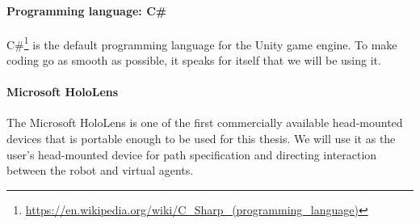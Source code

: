 \paragraph{Programming language: C\#} 
C\#\footnote{\protect\url{https://en.wikipedia.org/wiki/C\_Sharp\_(programming\_language)}} is the default programming language for the Unity game engine. To make coding go as smooth as possible, it speaks for itself that we will be using it.

\paragraph{Microsoft HoloLens}
The Microsoft HoloLens is one of the first commercially available head-mounted devices that is portable enough to be used for this thesis. We will use it as the user's head-mounted device for path specification and directing interaction between the robot and virtual agents.

